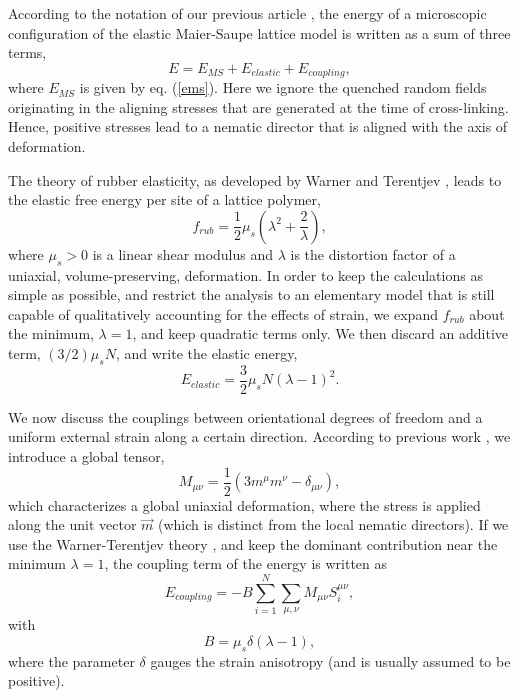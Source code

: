 \documentclass[aps,pre,reprint,amsmath,amssymbols,superscriptaddress,
nofootinbib]{revtex4-1}
\begin{document}
According to the notation of our previous article \cite{Liarte2011}, the
energy of a microscopic configuration of the elastic Maier-Saupe lattice model
is written as a sum of three terms,%
\begin{equation}
E=E_{MS}+E_{elastic}+E_{coupling},\label{energy}%
\end{equation}
where $E_{MS}$ is given by eq. (\ref{ems}). Here we ignore the
quenched random fields originating in the aligning stresses that are generated
at the time of cross-linking. Hence, positive stresses lead to a nematic director
that is aligned with the axis of deformation.

The theory of rubber elasticity, as developed by Warner and
Terentjev \cite{Warner2003}, leads to the elastic free energy per site of a
lattice polymer,%
\begin{equation}
f_{rub}=\frac{1}{2}\mu_{s}\left(  \lambda^{2}+\frac{2}{\lambda}\right)  ,
\end{equation}
where $\mu_{s}>0$ is a linear shear modulus and $\lambda$ is the distortion
factor of a uniaxial, volume-preserving, deformation. In order to keep the
calculations as simple as possible, and restrict the analysis to an elementary
model that is still capable of qualitatively accounting for the effects of
strain, we expand $f_{rub}$ about the minimum, $\lambda=1$, and keep quadratic
terms only. We then discard an additive term, $\left(  3/2\right)  \mu_{s}%
N$, and write the elastic energy,%
\begin{equation}
E_{elastic}=\frac{3}{2}\mu_{s}N\left(  \lambda-1\right)  ^{2}.\label{eelastic}%
\end{equation}

We now discuss the couplings between orientational degrees of freedom and a
uniform external strain along a certain direction. According to previous work
\cite{Liarte2011}, we introduce a global tensor,%
\begin{equation}
M_{\mu\nu}=\frac{1}{2}\left(  3m^{\mu}m^{\nu}-\delta_{\mu\nu}\right)
,\label{Mmunu}%
\end{equation}
which characterizes a global uniaxial deformation, where the stress is applied
along the unit vector $\overrightarrow{m}$ (which is distinct from the local
nematic directors). If we use the Warner-Terentjev theory \cite{Warner2003},
and keep the dominant contribution near the minimum $\lambda=1 $, the coupling
term of the energy is written as%
\begin{equation}
E_{coupling}=-B\sum_{i=1}^{N}\sum_{\mu,\nu}M_{\mu\nu}S_{i}^{\mu\nu
},\label{ecoupling}%
\end{equation}
with%
\begin{equation}
B=\mu_{s}\delta\left(  \lambda-1\right)  ,\label{B}%
\end{equation}
where the parameter $\delta$ gauges the strain anisotropy (and is usually
assumed to be positive).
\end{document}
